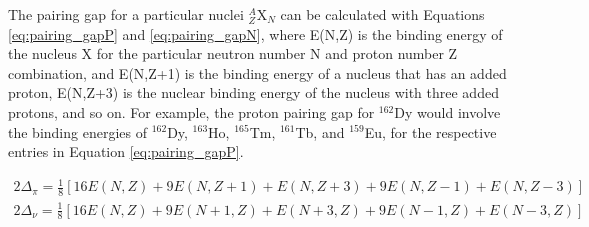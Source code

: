 The pairing gap for a particular nuclei $^A_Z$X$_N$ can be calculated with Equations \ref{eq:pairing_gapP} and \ref{eq:pairing_gapN}, where E(N,Z) is the binding energy of the nucleus X for the particular neutron number N and proton number Z combination, and E(N,Z+1) is the binding energy of a nucleus that has an added proton, E(N,Z+3) is the nuclear binding energy of the nucleus with three added protons, and so on. For example, the proton pairing gap for $^{162}$Dy would involve the binding energies of $^{162}$Dy, $^{163}$Ho, $^{165}$Tm, $^{161}$Tb, and $^{159}$Eu, for the respective entries in Equation \ref{eq:pairing_gapP}.

\begin{align}
2\Delta_{\pi}=\frac{1}{8}[16E(N,Z)+9E(N,Z+1)+E(N,Z+3)+9E(N,Z-1)+E(N,Z-3)] \label{eq:pairing_gapP}\\
2\Delta_{\nu}=\frac{1}{8}[16E(N,Z)+9E(N+1,Z)+E(N+3,Z)+9E(N-1,Z)+E(N-3,Z)] \label{eq:pairing_gapN}
\end{align}

